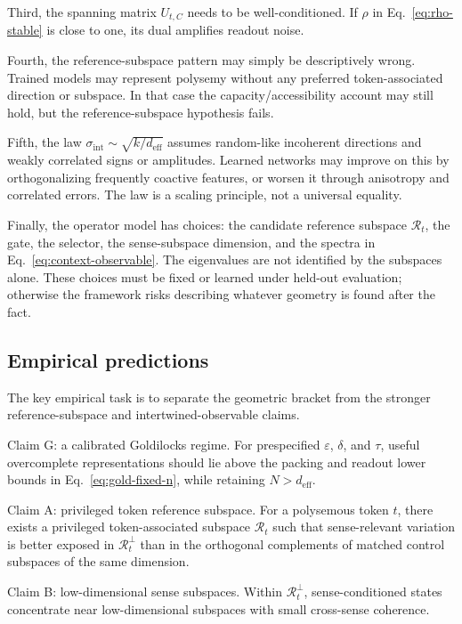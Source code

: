 \documentclass[
  aps,
  reprint,
  superscriptaddress,
  floatfix,
  nofootinbib,
  longbibliography
]{revtex4-2}
\newcommand{\deff}{d_{\mathrm{eff}}}
\newcommand{\sint}{\sigma_{\mathrm{int}}}
\begin{document}
Third, the spanning matrix $U_{t,C}$ needs to be well-conditioned. If
$\rho$ in Eq.~\eqref{eq:rho-stable} is close to one, its dual amplifies
readout noise.

Fourth, the reference-subspace pattern may simply be descriptively wrong. Trained
models may represent polysemy without any preferred token-associated
direction or subspace. In that case the capacity/accessibility
account may still hold, but the reference-subspace hypothesis fails.

Fifth, the law $\sint\sim\sqrt{k/\deff}$ assumes random-like
incoherent directions and weakly correlated signs or amplitudes.
Learned networks may improve on this by orthogonalizing frequently
coactive features, or worsen it through anisotropy and correlated
errors. The law is a scaling principle, not a universal equality.

Finally, the operator model has choices: the candidate reference subspace
$\mathcal R_t$, the gate, the selector, the sense-subspace dimension, and the
spectra in Eq.~\eqref{eq:context-observable}.  The eigenvalues are not
identified by the subspaces alone. These choices must be fixed or learned
under held-out evaluation; otherwise the framework risks describing whatever
geometry is found after the fact.

\subsection{Empirical predictions}
\label{sec:predictions}

The key empirical task is to separate the geometric bracket from the stronger
reference-subspace and intertwined-observable claims.

{Claim G: a calibrated Goldilocks regime.}
For prespecified $\varepsilon$, $\delta$, and $\tau$, useful overcomplete
representations should lie above the packing and readout lower bounds in
Eq.~\eqref{eq:gold-fixed-n}, while retaining $N>\deff$.

{Claim A: privileged token reference subspace.}
For a polysemous token $t$, there exists a privileged token-associated
subspace $\mathcal R_t$ such that sense-relevant variation is better
exposed in $\mathcal R_t^\perp$ than in the orthogonal complements of
matched control subspaces of the same dimension.

{Claim B: low-dimensional sense subspaces.}
Within $\mathcal R_t^\perp$,
sense-conditioned states concentrate near low-dimensional subspaces
with small cross-sense coherence.
\end{document}
